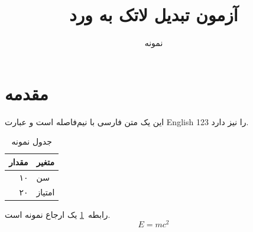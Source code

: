 \documentclass{article}
\title{آزمون تبدیل لاتک به ورد}
\author{نمونه}
\begin{document}
\maketitle
\section{مقدمه}
این یک متن فارسی با نیم‌فاصله است و عبارت English 123 را نیز دارد.

\begin{table}[ht]
\centering
\caption{جدول نمونه}
\label{tab:sample}
\begin{tabular}{rl}
\hline
مقدار & متغیر \\
\hline
۱۰ & سن \\
۲۰ & امتیاز \\
\hline
\end{tabular}
\end{table}
رابطه~\ref{tab:sample} یک ارجاع نمونه است.
\[
E = mc^2
\]
\end{document}
